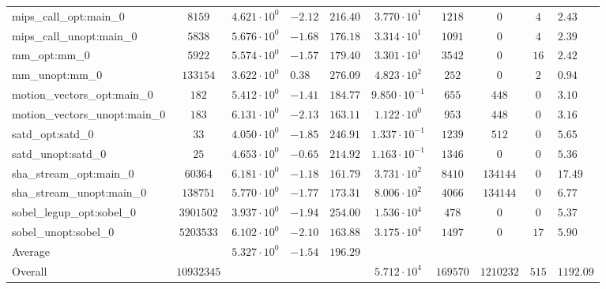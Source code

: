 \begin{tabular}{|l|c|HHc|c|c|c|cH|}
mips\_call\_opt:main\_0                         & $ 8159     $ & $ 4.621 \cdot 10^{0} $ & $ -2.12 $ & $ 216.40 $ & $ 3.770 \cdot 10^{1}  $ & $ 1218   $ & $ 0       $ & $ 4   $ & $ 2.43    $ \\
mips\_call\_unopt:main\_0                       & $ 5838     $ & $ 5.676 \cdot 10^{0} $ & $ -1.68 $ & $ 176.18 $ & $ 3.314 \cdot 10^{1}  $ & $ 1091   $ & $ 0       $ & $ 4   $ & $ 2.39    $ \\
mm\_opt:mm\_0                                   & $ 5922     $ & $ 5.574 \cdot 10^{0} $ & $ -1.57 $ & $ 179.40 $ & $ 3.301 \cdot 10^{1}  $ & $ 3542   $ & $ 0       $ & $ 16  $ & $ 2.42    $ \\
mm\_unopt:mm\_0                                 & $ 133154   $ & $ 3.622 \cdot 10^{0} $ & $ 0.38  $ & $ 276.09 $ & $ 4.823 \cdot 10^{2}  $ & $ 252    $ & $ 0       $ & $ 2   $ & $ 0.94    $ \\
motion\_vectors\_opt:main\_0                    & $ 182      $ & $ 5.412 \cdot 10^{0} $ & $ -1.41 $ & $ 184.77 $ & $ 9.850 \cdot 10^{-1} $ & $ 655    $ & $ 448     $ & $ 0   $ & $ 3.10    $ \\
motion\_vectors\_unopt:main\_0                  & $ 183      $ & $ 6.131 \cdot 10^{0} $ & $ -2.13 $ & $ 163.11 $ & $ 1.122 \cdot 10^{0}  $ & $ 953    $ & $ 448     $ & $ 0   $ & $ 3.16    $ \\
satd\_opt:satd\_0                               & $ 33       $ & $ 4.050 \cdot 10^{0} $ & $ -1.85 $ & $ 246.91 $ & $ 1.337 \cdot 10^{-1} $ & $ 1239   $ & $ 512     $ & $ 0   $ & $ 5.65    $ \\
satd\_unopt:satd\_0                             & $ 25       $ & $ 4.653 \cdot 10^{0} $ & $ -0.65 $ & $ 214.92 $ & $ 1.163 \cdot 10^{-1} $ & $ 1346   $ & $ 0       $ & $ 0   $ & $ 5.36    $ \\
sha\_stream\_opt:main\_0                        & $ 60364    $ & $ 6.181 \cdot 10^{0} $ & $ -1.18 $ & $ 161.79 $ & $ 3.731 \cdot 10^{2}  $ & $ 8410   $ & $ 134144  $ & $ 0   $ & $ 17.49   $ \\
sha\_stream\_unopt:main\_0                      & $ 138751   $ & $ 5.770 \cdot 10^{0} $ & $ -1.77 $ & $ 173.31 $ & $ 8.006 \cdot 10^{2}  $ & $ 4066   $ & $ 134144  $ & $ 0   $ & $ 6.77    $ \\
sobel\_legup\_opt:sobel\_0                      & $ 3901502  $ & $ 3.937 \cdot 10^{0} $ & $ -1.94 $ & $ 254.00 $ & $ 1.536 \cdot 10^{4}  $ & $ 478    $ & $ 0       $ & $ 0   $ & $ 5.37    $ \\
sobel\_unopt:sobel\_0                           & $ 5203533  $ & $ 6.102 \cdot 10^{0} $ & $ -2.10 $ & $ 163.88 $ & $ 3.175 \cdot 10^{4}  $ & $ 1497   $ & $ 0       $ & $ 17  $ & $ 5.90    $ \\
\hline
Average                                         & $          $ & $ 5.327 \cdot 10^{0} $ & $ -1.54 $ & $ 196.29 $ & $                     $ & $        $ & $         $ & $     $ & $         $ \\
\hline
Overall                                         & $ 10932345 $ & $                    $ & $       $ & $        $ & $ 5.712 \cdot 10^{4}  $ & $ 169570 $ & $ 1210232 $ & $ 515 $ & $ 1192.09 $ \\
\hline
\end{tabular}
